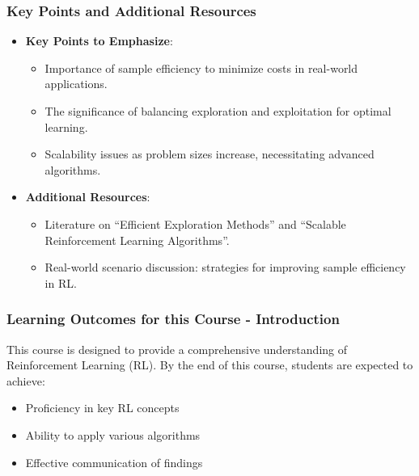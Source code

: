 \documentclass[aspectratio=169]{beamer}
\begin{document}
\begin{frame}[fragile]
    \frametitle{Key Points and Additional Resources}
    \begin{itemize}
        \item \textbf{Key Points to Emphasize}:
        \begin{itemize}
            \item Importance of sample efficiency to minimize costs in real-world applications.
            \item The significance of balancing exploration and exploitation for optimal learning.
            \item Scalability issues as problem sizes increase, necessitating advanced algorithms.
        \end{itemize}
        \item \textbf{Additional Resources}:
        \begin{itemize}
            \item Literature on “Efficient Exploration Methods” and “Scalable Reinforcement Learning Algorithms”.
            \item Real-world scenario discussion: strategies for improving sample efficiency in RL.
        \end{itemize}
    \end{itemize}
\end{frame}

\begin{frame}[fragile]
    \frametitle{Learning Outcomes for this Course - Introduction}
    This course is designed to provide a comprehensive understanding of Reinforcement Learning (RL). By the end of this course, students are expected to achieve:
    \begin{itemize}
        \item Proficiency in key RL concepts
        \item Ability to apply various algorithms
        \item Effective communication of findings
    \end{itemize}
\end{frame}
\end{document}
